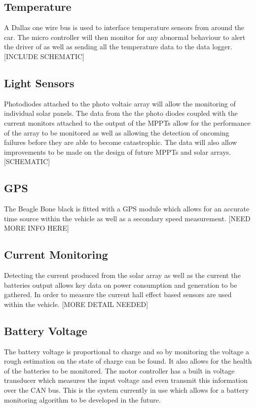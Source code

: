 \documentclass[10pt,a4paper]{article}
\begin{document}
\subsection{Temperature}
A Dallas one wire bus is used to interface temperature sensors from around the car. The micro controller will then monitor for any abnormal behaviour to alert the driver of as well as sending all the temperature data to the data logger. [INCLUDE SCHEMATIC]

\subsection{Light Sensors}
Photodiodes attached to the photo voltaic array will allow the monitoring of individual solar panels. The data from the the photo diodes coupled with the current monitors attached to the output of the MPPTs allow for the performance of the array to be monitored as well as allowing the detection of oncoming failures before they are able to become catastrophic. The data will also allow improvements to be made on the design of future MPPTs and solar arrays. [SCHEMATIC] 

\subsection{GPS}
The Beagle Bone black is fitted with a GPS module which allows for an accurate time source within the vehicle as well as a secondary speed measurement. [NEED MORE INFO HERE]

\subsection{Current Monitoring}
Detecting the current produced from the solar array as well as the current the batteries output allows key data on power consumption and generation to be gathered. In order to measure the current hall effect based sensors are used within the vehicle. [MORE DETAIL NEEDED]

\subsection{Battery Voltage}

The battery voltage is proportional to charge and so by monitoring the voltage a rough estimation on the state of charge can be found. It also allows for the health of the batteries to be monitored. The motor controller has a built in voltage transducer which measures the input voltage and even transmit this information over the CAN bus. This is the system currently in use which allows for a battery monitoring algorithm to be developed in the future.
\end{document}
